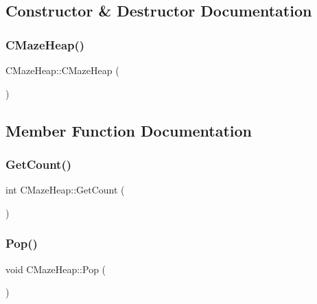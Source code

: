 \subsection{Constructor \& Destructor Documentation}
\mbox{\label{classCMazeHeap_a05d1e0c967a6da8013462cc31e1c7f29}} 
\subsubsection{\texorpdfstring{CMazeHeap()}{CMazeHeap()}}
{\footnotesize\ttfamily C\+Maze\+Heap\+::\+C\+Maze\+Heap (\begin{DoxyParamCaption}{ }\end{DoxyParamCaption})\hspace{0.3cm}{\ttfamily [inline]}}



\subsection{Member Function Documentation}
\mbox{\label{classCMazeHeap_a4c22a9b5b187dab652852865759e4ac8}} 
\subsubsection{\texorpdfstring{GetCount()}{GetCount()}}
{\footnotesize\ttfamily int C\+Maze\+Heap\+::\+Get\+Count (\begin{DoxyParamCaption}{ }\end{DoxyParamCaption})\hspace{0.3cm}{\ttfamily [inline]}}

\mbox{\label{classCMazeHeap_aed07b26593ef69be25b800cc06ddfaff}} 
\subsubsection{\texorpdfstring{Pop()}{Pop()}}
{\footnotesize\ttfamily void C\+Maze\+Heap\+::\+Pop (\begin{DoxyParamCaption}{ }\end{DoxyParamCaption})\hspace{0.3cm}{\ttfamily [inline]}}

